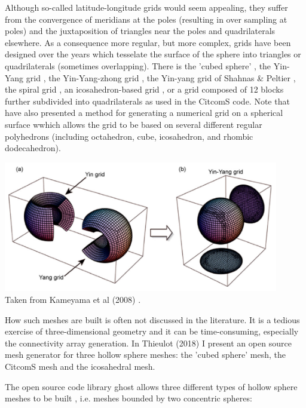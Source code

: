 Although so-called latitude-longitude grids would seem appealing, they suffer from the convergence of meridians at the poles
(resulting in over sampling at poles)
and the juxtaposition of triangles near the poles and quadrilaterals elsewhere. 
As a consequence more regular, but more complex, grids have been designed over the years which tesselate the surface of the 
sphere into triangles or quadrilaterals (sometimes overlapping).
There is the 'cubed sphere' \cite{roip96,heta03,chob05,sthh06,chcc07,brmw10,yiym19},
the Yin-Yang grid \cite{kasa04,yoka04,yoka06,kaks08,tack08,crta14,crta16},
the Yin-Yang-zhong grid \cite{haka16}, the Yin-yang grid of 
Shahnas \& Peltier \cite{shpe15}, the spiral grid \cite{hust08}, 
an icosahedron-based grid \cite{bafr85,tasu01},
or a grid composed of 12 blocks further subdivided into quadrilaterals \cite{zhzm00} 
as used in the CitcomS code.
Note that \cite{oldp12} have also presented a method for generating a numerical 
grid on a spherical surface wwhich 
allows the grid to be based on several different regular polyhedrons (including octahedron, 
cube, icosahedron, and rhombic dodecahedron). 

\begin{center}
\includegraphics[width=12cm]{images/meshes/kaks08}\\
{\captionfont Taken from Kameyama et al (2008) \cite{kaks08}.}
\end{center}


How such meshes are built is often not discussed in the literature. It is 
a tedious exercise of three-dimensional geometry and it can be time-consuming, especially 
the connectivity array generation. In Thieulot (2018) \cite{thie18} I present an open source 
mesh generator for three hollow sphere meshes: the 'cubed sphere' mesh, the CitcomS mesh and the 
icosahedral mesh.


The open source code library {\sc ghost}\cite{thie18} allows 
three different types of hollow sphere meshes to be built
, i.e. meshes bounded by two concentric spheres:

